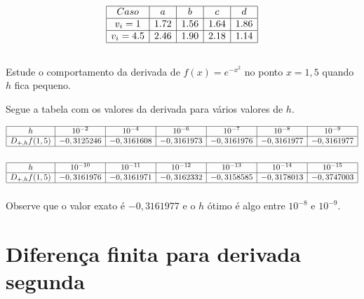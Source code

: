 \begin{resp}
\begin{equation}\begin{array}{|c|c|c|c|c|}\hline
 Caso &  a  &   b &   c   &   d \\ \hline
 v_i=1 & 1.72   & 1.56  &  1.64 & 1.86 \\ \hline
v_i=4.5 &2.46    & 1.90  &  2.18  &1.14  \\ \hline
\multicolumn{5}{c}{}
\end{array}
\end{equation}    
\end{resp}

\begin{exer}Estude o comportamento da derivada de $f(x)=e^{-x^2}$ no ponto $x=1,5$ quando $h$ fica pequeno.
\end{exer}
\begin{resp}
  
Segue a tabela com os valores da derivada para vários valores de $h$.

\begin{equation}
\begin{array}{|c|c|c|c|c|c|c|}\hline
h&10^{-2}&10^{-4}&10^{-6}&10^{-7}&10^{-8}&10^{-9}\\\hline
D_{+,h}f(1,5)& - 0,3125246&- 0,3161608 &- 0,3161973&- 0,3161976&- 0,3161977&- 0,3161977 \\\hline
\multicolumn{7}{c}{}
\end{array}  
\end{equation}  
\begin{equation}
\begin{array}{|c|c|c|c|c|c|c|}\hline
h&10^{-10}&10^{-11}&10^{-12}&10^{-13}&10^{-14}&10^{-15}\\\hline
D_{+,h}f(1,5)&- 0,3161976&- 0,3161971&- 0,3162332&- 0,3158585&- 0,3178013&- 0,3747003\\\hline
\multicolumn{7}{c}{}
\end{array}
\end{equation}
Observe que o valor exato é $-0,3161977$ e o $h$ ótimo é algo entre $10^{-8}$ e $10^{-9}$.        
\end{resp}

\section{Diferença finita para derivada segunda}


